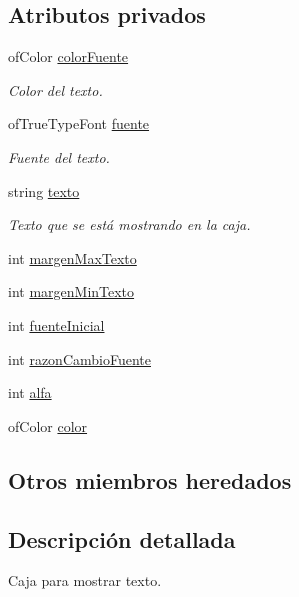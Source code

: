 \subsection*{Atributos privados}
\begin{DoxyCompactItemize}
\item 
of\+Color \hyperlink{classcaja_texto_a281b136399f6b3ee3fedfaa9069bebad}{color\+Fuente}
\begin{DoxyCompactList}\small\item\em Color del texto. \end{DoxyCompactList}\item 
of\+True\+Type\+Font \hyperlink{classcaja_texto_aa5cbc731d2fc56d87210d6ae6d2319b0}{fuente}
\begin{DoxyCompactList}\small\item\em Fuente del texto. \end{DoxyCompactList}\item 
string \hyperlink{classcaja_texto_a5b62049df6eb5efb5831b57b4958d115}{texto}
\begin{DoxyCompactList}\small\item\em Texto que se está mostrando en la caja. \end{DoxyCompactList}\item 
int \hyperlink{classcaja_texto_a779378b7d6c746df32e86b0f3a7eaa0e}{margen\+Max\+Texto}
\item 
int \hyperlink{classcaja_texto_a1003061aaaac05741ede0303e5a7f6cc}{margen\+Min\+Texto}
\item 
int \hyperlink{classcaja_texto_a621c5f95927c538ca286827a06d861d0}{fuente\+Inicial}
\item 
int \hyperlink{classcaja_texto_ab5e905a37e7247d0f2b0c139ad49970e}{razon\+Cambio\+Fuente}
\item 
int \hyperlink{classcaja_texto_aa52a0f1d3f9041daa3f0e270214d85aa}{alfa}
\item 
of\+Color \hyperlink{classcaja_texto_a7c9fcc0013453675b9c08c4db98ee615}{color}
\end{DoxyCompactItemize}
\subsection*{Otros miembros heredados}


\subsection{Descripción detallada}
Caja para mostrar texto. 

